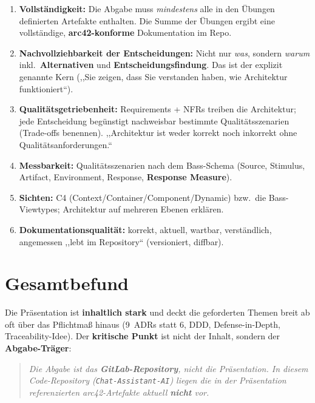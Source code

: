 \documentclass[11pt,a4paper]{article}
\begin{document}
\begin{enumerate}[leftmargin=1.5em]
  \item \textbf{Vollst\"andigkeit:} Die Abgabe muss \emph{mindestens} alle in den
        \"Ubungen definierten Artefakte enthalten. Die Summe der \"Ubungen ergibt
        eine vollst\"andige, \textbf{arc42-konforme} Dokumentation im Repo.
  \item \textbf{Nachvollziehbarkeit der Entscheidungen:} Nicht nur \emph{was},
        sondern \emph{warum} \textendash{} inkl.\ \textbf{Alternativen} und
        \textbf{Entscheidungsfindung}. Das ist der explizit genannte Kern
        (,,Sie zeigen, dass Sie verstanden haben, wie Architektur funktioniert``).
  \item \textbf{Qualit\"atsgetriebenheit:} Requirements + NFRs treiben die
        Architektur; jede Entscheidung beg\"unstigt nachweisbar bestimmte
        Qualit\"atsszenarien (Trade-offs benennen). ,,Architektur ist weder
        korrekt noch inkorrekt ohne Qualit\"atsanforderungen.``
  \item \textbf{Messbarkeit:} Qualit\"atsszenarien nach dem Bass-Schema
        (Source, Stimulus, Artifact, Environment, Response, \textbf{Response Measure}).
  \item \textbf{Sichten:} C4 (Context/Container/Component/Dynamic) bzw.\ die
        Bass-Viewtypes; Architektur auf mehreren Ebenen erkl\"aren.
  \item \textbf{Dokumentationsqualit\"at:} korrekt, aktuell, wartbar, verst\"andlich,
        angemessen \textendash{} ,,lebt im Repository`` (versioniert, diffbar).
\end{enumerate}

\section{Gesamtbefund}
Die Pr\"asentation ist \textbf{inhaltlich stark} und deckt die geforderten Themen
breit ab \textendash{} oft \"uber das Pflichtma{\ss} hinaus (9~ADRs statt 6, DDD,
Defense-in-Depth, Traceability-Idee). Der \textbf{kritische Punkt} ist nicht der
Inhalt, sondern der \textbf{Abgabe-Tr\"ager}:

\begin{quote}\itshape
Die Abgabe ist das \textbf{GitLab-Repository}, nicht die Pr\"asentation. In diesem
Code-Repository (\texttt{Chat-Assistant-AI}) liegen die in der Pr\"asentation
referenzierten arc42-Artefakte aktuell \textbf{nicht} vor.
\end{quote}
\end{document}
